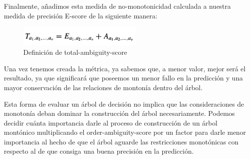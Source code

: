 Finalmente, añadimos esta medida de no-monotonicidad calculada a nuestra medida de precisión E-score de la siguiente manera:

\begin{figure}[H]
	\centering
	\includegraphics[width=0.55\textwidth]{imagenes/tas} 
	\caption{Definición de total-ambiguity-score \cite{ref14}}
\end{figure}

Una vez tenemos creada la métrica, ya sabemos que, a menor valor, mejor será el resultado, ya que significará que poseemos un menor fallo en la predicción y una mayor conservación de las relaciones de montonía dentro del árbol.

Esta forma de evaluar un árbol de decisión no implica que las consideraciones de monotonía deban dominar la construcción del árbol necesariamente. Podemos decidir cuánta importancia darle al proceso de construcción de un árbol montónico multiplicando el order-ambiguity-score por un factor para darle menor importancia al hecho de que el árbol aguarde las restricciones monotónicas con respecto al de que consiga una buena precisión en la predicción. \cite{ref14}

\newpage


